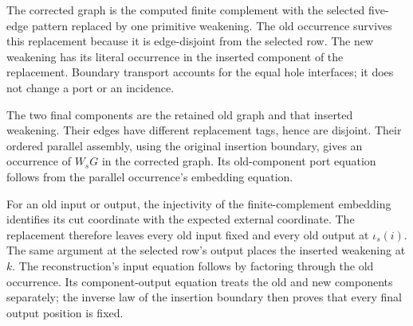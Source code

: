 The corrected graph is the computed finite complement with the selected
five-edge pattern replaced by one primitive weakening. The old occurrence
survives this replacement because it is edge-disjoint from the selected row.
The new weakening has its literal occurrence in the inserted component of
the replacement. Boundary transport accounts for the equal hole interfaces;
it does not change a port or an incidence.

The two final components are the retained old graph and that inserted
weakening. Their edges have different replacement tags, hence are disjoint.
Their ordered parallel assembly, using the original insertion boundary,
gives an occurrence of $W_sG$ in the corrected graph. Its old-component
port equation follows from the parallel occurrence's embedding equation.

For an old input or output, the injectivity of the finite-complement embedding
identifies its cut coordinate with the expected external coordinate.
The replacement therefore leaves every old input fixed and every old output
at $\iota_s(i)$. The same argument at the selected row's output places the
inserted weakening at $k$. The reconstruction's input equation follows by
factoring through the old occurrence. Its component-output equation treats
the old and new components separately; the inverse law of the insertion
boundary then proves that every final output position is fixed.

